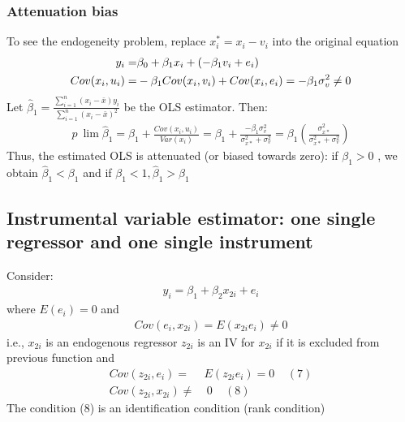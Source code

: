 \documentclass[a4paper,twoside,11pt]{article}
\begin{document}
\subsubsection{Attenuation bias}
To see the endogeneity problem, replace $x_i^* = x_i-v_i$ into the original equation
\begin{equation*}
\begin{aligned}
y_i =& \beta_0 + \beta_1 x_i + (-\beta_1 v_i + e_i) \\
\newline
\newline
Cov(x_i, u_i) =& - \beta_1 Cov(x_i, v_i) + Cov(x_i, e_i) = -\beta_1 \sigma_v^2 \ne 0
\end{aligned} 
\end{equation*}
Let $\hat{\beta}_1= \frac{\sum^n_{i=1}(x_i - \bar x)y_i}{\sum^n_{i=1}(x_i - \bar x)^2}$ be the OLS estimator. Then:
\begin{equation*}
\begin{aligned}
p \ \lim \hat{\beta}_1 = \beta_1 + \frac{Cov(x_i,u_i)}{Var(x_i)} = \beta_1 + \frac{- \beta_1 \sigma^2_v}{\sigma_{x*}^2 + \sigma_v^2} = \beta_1 ( \frac{\sigma_{x*}^2}{\sigma_{x*}^2 + \sigma_v^2})
\end{aligned} 
\end{equation*}
Thus, the estimated OLS is attenuated (or biased towards zero): if $\beta_1 >0$ , we obtain $\hat{\beta}_1 < \beta_1$ and if $\beta_1 <1, \hat{\beta}_1 > \beta_1$
\subsection{Instrumental variable estimator: one single regressor and one single instrument}
Consider:
\begin{equation*}
\begin{aligned}
y_i = \beta_1 + \beta_2 x_{2i} + e_i
\end{aligned} 
\end{equation*}
where $E(e_i)=0$ and
\begin{equation*}
\begin{aligned}
Cov(e_i, x_{2i} ) = E(x_{2i} e_i) \ne 0
\end{aligned} 
\end{equation*}
i.e., $x_{2i}$ is an endogenous regressor
\newline
\newline
$z_{2i}$ is an IV for $x_{2i}$ if it is excluded from previous function and 
\begin{equation*}
\begin{aligned}
Cov(z_{2i},e_i) =& E(z_{2i} e_i)=0 \ \ \ \ \ (7) \\
Cov(z_{2i}, x_{2i} ) \ne& \ 0 \ \ \ \ \ (8)
\end{aligned} 
\end{equation*}
The condition (8) is an identification condition (rank condition)
\end{document}
